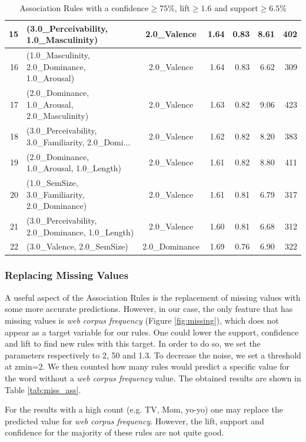 \documentclass[a4paper,11pt,dvipsnames]{article}
\begin{document}
\begin{table}[h]
{\begin{tabular}{|r|l|c|r|r|r|r|}
15 &              (3.0\_Perceivability, 1.0\_Masculinity) &         2.0\_Valence &  1.64 &  0.83 &      8.61 &   402 \\\hline
16 &      (1.0\_Masculinity, 2.0\_Dominance, 1.0\_Arousal) &         2.0\_Valence &  1.64 &  0.83 &      6.62 &   309 \\\hline
17 &      (2.0\_Dominance, 1.0\_Arousal, 2.0\_Masculinity) &         2.0\_Valence &  1.63 &  0.82 &      9.06 &   423 \\\hline
18 &  (3.0\_Perceivability, 3.0\_Familiarity, 2.0\_Domi... &         2.0\_Valence &  1.62 &  0.82 &      8.20 &   383 \\\hline
19 &           (2.0\_Dominance, 1.0\_Arousal, 1.0\_Length) &         2.0\_Valence &  1.61 &  0.82 &      8.80 &   411 \\\hline
20 &      (1.0\_SemSize, 3.0\_Familiarity, 2.0\_Dominance) &         2.0\_Valence &  1.61 &  0.81 &      6.79 &   317 \\\hline
21 &    (3.0\_Perceivability, 2.0\_Dominance, 1.0\_Length) &         2.0\_Valence &  1.60 &  0.81 &      6.68 &   312 \\\hline
22 &                         (3.0\_Valence, 2.0\_SemSize) &       2.0\_Dominance &  1.69 &  0.76 &      6.90 &   322 \\
\bottomrule
\end{tabular}
}
        \caption{Association Rules with a confidence$\geq75\%$, lift$\geq1.6$ and support$\geq6.5\%$}\label{tab:rules}

\end{table}

\subsubsection{Replacing Missing Values}
A useful aspect of the Association Rules is the replacement of missing values with some more accurate predictions. However, in our case, the only feature that has missing values is \textit{web corpus frequency} (Figure \ref{fig:missing}), which does not appear as a target variable for our rules. One could lower the support, confidence and lift to find new rules with this target. In order to do so, we set the parameters respectively to 2, 50 and 1.3. To decrease the noise, we set a threshold at zmin=2. We then counted how many rules would predict a specific value for the word without a \textit{web corpus frequency} value. The obtained results are shown in Table \ref{tab:miss_ass}.


For the results with a high count (e.g. TV, Mom, yo-yo) one may replace the predicted value for \textit{web corpus frequency}. However, the lift, support and confidence for the majority of these rules are not quite good.
\end{document}
